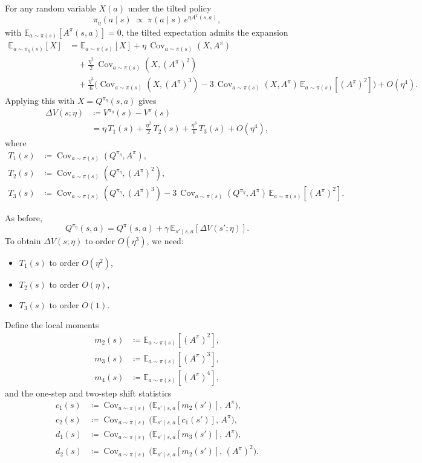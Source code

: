 \documentclass[11pt]{article}
\theoremstyle{definition}
\theoremstyle{remark}
\newcommand{\E}{\mathbb{E}}
\DeclareMathOperator{\Cov}{Cov}
\begin{document}
For any random variable $X(a)$ under the tilted policy
\[
  \pi_\eta(a \mid s)\;\propto\;\pi(a \mid s)\,e^{\eta A^\pi(s,a)},
\]
with $\E_{a\sim\pi(s)}[A^\pi(s,a)] = 0$, the tilted expectation admits the expansion
\begin{align}
  \E_{a\sim\pi_\eta(s)}[X]
  &= \E_{a\sim\pi(s)}[X]
   + \eta\,\Cov_{a\sim\pi(s)}(X,A^\pi) \nonumber\\
  &\quad + \frac{\eta^2}{2}\,\Cov_{a\sim\pi(s)}(X,(A^\pi)^2) \nonumber\\
  &\quad + \frac{\eta^3}{6}\Big(
      \Cov_{a\sim\pi(s)}(X,(A^\pi)^3)
      - 3\,\Cov_{a\sim\pi(s)}(X,A^\pi)\,\E_{a\sim\pi(s)}[(A^\pi)^2]
    \Big)
  + O(\eta^4).
\end{align}
Applying this with $X = Q^{\pi_\eta}(s,a)$ gives
\begin{align}
  \Delta V(s;\eta)
  &\coloneqq V^{\pi_\eta}(s) - V^\pi(s) \nonumber\\
  &= \eta\,T_1(s)
   + \frac{\eta^2}{2}\,T_2(s)
   + \frac{\eta^3}{6}\,T_3(s)
   + O(\eta^4),
\end{align}
where
\begin{align}
  T_1(s)
  &\coloneqq \Cov_{a\sim\pi(s)}(Q^{\pi_\eta},A^\pi), \\
  T_2(s)
  &\coloneqq \Cov_{a\sim\pi(s)}(Q^{\pi_\eta},(A^\pi)^2), \\
  T_3(s)
  &\coloneqq \Cov_{a\sim\pi(s)}(Q^{\pi_\eta},(A^\pi)^3)
  - 3\,\Cov_{a\sim\pi(s)}(Q^{\pi_\eta},A^\pi)\,\E_{a\sim\pi(s)}[(A^\pi)^2].
\end{align}

As before,
\begin{equation}
  Q^{\pi_\eta}(s,a)
  = Q^\pi(s,a) + \gamma\,\E_{s' \mid s,a}[\Delta V(s';\eta)].
\end{equation}
To obtain $\Delta V(s;\eta)$ to order $O(\eta^3)$, we need:
\begin{itemize}
  \item $T_1(s)$ to order $O(\eta^2)$,
  \item $T_2(s)$ to order $O(\eta)$,
  \item $T_3(s)$ to order $O(1)$.
\end{itemize}

Define the local moments
\begin{align}
  m_2(s) &\coloneqq \E_{a\sim\pi(s)}[(A^\pi)^2], \\
  m_3(s) &\coloneqq \E_{a\sim\pi(s)}[(A^\pi)^3], \\
  m_4(s) &\coloneqq \E_{a\sim\pi(s)}[(A^\pi)^4],
\end{align}
and the one-step and two-step shift statistics
\begin{align}
  c_1(s)
  &\coloneqq \Cov_{a\sim\pi(s)}\!\Big(\E_{s' \mid s,a}[m_2(s')],\,A^\pi\Big), \\
  c_2(s)
  &\coloneqq \Cov_{a\sim\pi(s)}\!\Big(\E_{s' \mid s,a}[c_1(s')],\,A^\pi\Big), \\
  d_1(s)
  &\coloneqq \Cov_{a\sim\pi(s)}\!\Big(\E_{s' \mid s,a}[m_3(s')],\,A^\pi\Big), \\
  d_2(s)
  &\coloneqq \Cov_{a\sim\pi(s)}\!\Big(\E_{s' \mid s,a}[m_2(s')],\,(A^\pi)^2\Big).
\end{align}
\end{document}
